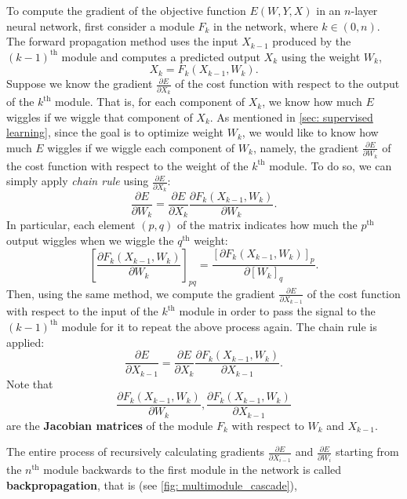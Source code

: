 To compute the gradient of the objective function $E(W,Y,X)$ in an $n$-layer neural network, first consider a module $F_k$ in the network, where $k\in (0, n)$.
The forward propagation method uses the input $X_{k-1}$ produced by the $(k-1)^{\text{th}}$ module and computes a predicted output $X_k$ using the weight $W_k$, 
\[ X_k=F_k(X_{k-1},W_k). \]
Suppose we know the gradient $\frac{\partial E}{\partial X_k}$ of the cost function with respect to the output of the $k^\text{th}$ module.
That is, for each component of $X_k$, we know how much $E$ wiggles if we wiggle that component of $X_k$.
As mentioned in \cref{sec: supervised learning}, since the goal is to optimize weight $W_k$, we would like to know how much $E$ wiggles if we wiggle each component of $W_k$, namely, the gradient $\frac{\partial E}{\partial W_k}$ of the cost function with respect to the weight of the $k^\text{th}$ module.
To do so, we can simply apply \textit{chain rule} using $\frac{\partial E}{\partial X_k}$: 
\[
\frac{\partial E}{\partial W_k} = \frac{\partial E}{\partial X_k} \frac{\partial F_k(X_{k-1},W_k)}{\partial W_k}.
\]
In particular, each element $(p,q)$ of the matrix indicates how much the $p^\text{th}$ output wiggles when we wiggle the $q^\text{th}$ weight:
\[
\left[ \frac{\partial F_k(X_{k-1},W_k)}{\partial W_k} \right]_{pq} = \frac{[\partial F_k(X_{k-1},W_k)]_p}{\partial [W_k]_q}.
\]
Then, using the same method, we compute the gradient $\frac{\partial E}{\partial X_{k-1}}$ of the cost function with respect to the input of the $k^\text{th}$ module in order to pass the signal to the $(k-1)^\text{th}$ module for it to repeat the above process again.
The chain rule is applied:
\[
\frac{\partial E}{\partial X_{k-1}} = \frac{\partial E}{\partial X_k} \frac{\partial F_k(X_{k-1},W_k)}{\partial X_{k-1}}.
\]
Note that 
\[
\frac{\partial F_k(X_{k-1},W_k)}{\partial W_k}, \frac{\partial F_k(X_{k-1},W_k)}{\partial X_{k-1}}
\]
are the \textbf{Jacobian matrices} of the module $F_k$ with respect to  $W_k$ and $X_{k-1}$.

The entire process of recursively calculating gradients $\frac{\partial E}{\partial X_{i-1}}$ and $\frac{\partial E}{\partial W_i}$ starting from the $n^\text{th}$ module backwards to the first module in the network is called \textbf{backpropagation}, that is (see \cref{fig: multimodule_cascade}),

